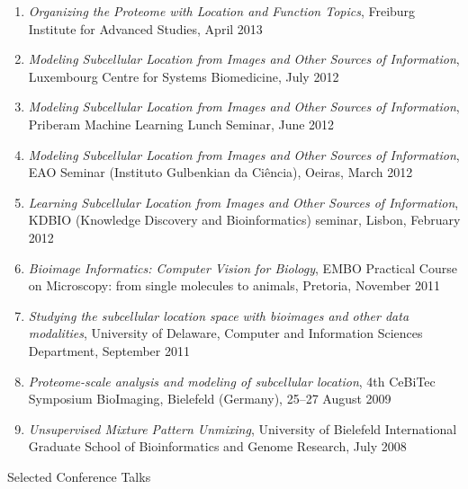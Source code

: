 \documentclass{article}
\renewcommand\subsection[1]{%
    \par\vspace{.1em}%
    {\hspace{1em}\subsubhead #1}%
    \par\vspace{.2em}%
}
\begin{document}
\begin{enumerate}
{Applications}, European Bioimage Analysis Symposium, Barcelona, October 2013
\item \emph{Organizing the Proteome with Location and Function Topics},
Freiburg Institute for Advanced Studies, April 2013
\item \emph{Modeling Subcellular Location from Images and Other Sources of
Information}, Luxembourg Centre for Systems Biomedicine, July 2012
\item \emph{Modeling Subcellular Location from Images and Other Sources of
Information}, Priberam Machine Learning Lunch Seminar, June 2012
\item \emph{Modeling Subcellular Location from Images and Other Sources of
Information}, EAO Seminar (Instituto Gulbenkian da Ciência), Oeiras, March 2012
\item \emph{Learning Subcellular Location from Images and Other Sources of
Information}, KDBIO (Knowledge Discovery and Bioinformatics) seminar, Lisbon,
February 2012
\item \emph{Bioimage Informatics: Computer Vision for Biology}, EMBO Practical
Course on Microscopy: from single molecules to animals, Pretoria, November 2011
\item \emph{Studying the subcellular location space with bioimages and other
data modalities}, University of Delaware, Computer and Information Sciences
Department, September 2011
\item \emph{Proteome-scale analysis and modeling of subcellular location}, 4th
CeBiTec Symposium BioImaging, Bielefeld (Germany), 25--27 August 2009
\item \emph{Unsupervised Mixture Pattern Unmixing}, University of Bielefeld
International Graduate School of Bioinformatics and Genome Research, July 2008
\end{enumerate}

\subsection{Selected Conference Talks}
\end{document}
